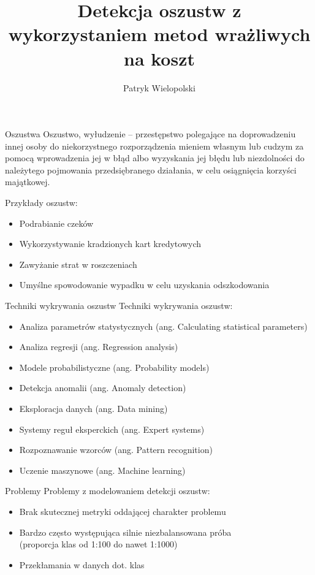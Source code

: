 \documentclass[10pt]{beamer}
\title{Detekcja oszustw z wykorzystaniem metod wrażliwych na koszt}
\author{Patryk Wielopolski}
\institute{Promotor: dr inż. Andrzej Giniewicz}
\date{}
\begin{document}
\maketitle

\begin{frame}{Oszustwa}
    Oszustwo, wyłudzenie – przestępstwo polegające na doprowadzeniu innej osoby do niekorzystnego rozporządzenia mieniem własnym lub cudzym za pomocą wprowadzenia jej w błąd albo wyzyskania jej błędu lub niezdolności do należytego pojmowania przedsiębranego działania, w celu osiągnięcia korzyści majątkowej. 
    
    
    Przykłady oszustw:
    \begin{itemize}
        \item Podrabianie czeków
        \item Wykorzystywanie kradzionych kart kredytowych
        \item Zawyżanie strat w roszczeniach
        \item Umyślne spowodowanie wypadku w celu uzyskania odszkodowania
    \end{itemize}{}
    
    \nocite{CSCCFD}
    \nocite{ICCFD}
    \nocite{alej2015ensemble}
\end{frame}{}

\begin{frame}{Techniki wykrywania oszustw}
    Techniki wykrywania oszustw:
    \begin{itemize}
        \item Analiza parametrów statystycznych (ang. Calculating statistical parameters)
        \item Analiza regresji (ang. Regression analysis)
        \item Modele probabilistyczne (ang. Probability models)
        \item Detekcja anomalii (ang. Anomaly detection)
        \item Eksploracja danych (ang. Data mining)
        \item Systemy reguł eksperckich (ang. Expert systems)
        \item Rozpoznawanie wzorców (ang. Pattern recognition)
        \item Uczenie maszynowe (ang. Machine learning)
    \end{itemize}{}
\end{frame}{}

\begin{frame}{Problemy}
    Problemy z modelowaniem detekcji oszustw:
    \begin{itemize}
        \item Brak skutecznej metryki oddającej charakter problemu
        \item Bardzo często występująca silnie niezbalansowana próba \\ (proporcja klas od 1:100 do nawet 1:1000)
        \item Przekłamania w danych dot. klas
    \end{itemize}
\end{frame}{}
\end{document}
